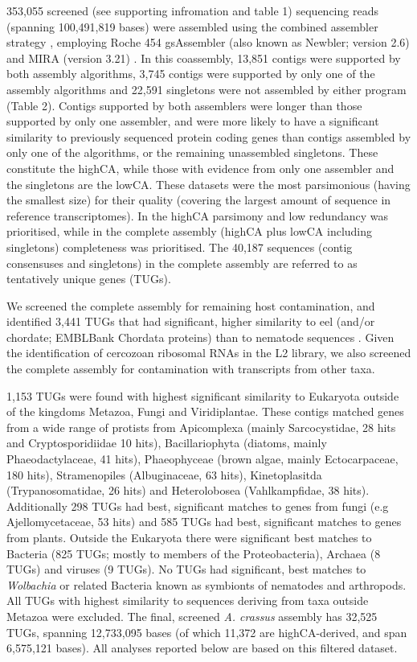 \documentclass[10pt]{bmc_article}
\newenvironment{bmcformat}{\begin{raggedright}\baselineskip20pt\sloppy\setboolean{publ}{false}}{\end{raggedright}\baselineskip20pt\sloppy}
\begin{document}
\begin{bmcformat}
353,055 screened (see supporting infromation and
table 1) sequencing reads (spanning 100,491,819 bases) were
assembled using the combined assembler strategy \cite{pmid20950480},
employing Roche 454 gsAssembler (also known as Newbler; version 2.6)
and MIRA (version 3.21) \cite{miraEST}. In this coassembly,
13,851 contigs were supported by both assembly algorithms,
3,745 contigs were supported by only one of the assembly
algorithms and 22,591 singletons were not assembled by
either program (Table 2). Contigs supported by both assemblers were
longer than those supported by only one assembler, and were more
likely to have a significant similarity to previously sequenced
protein coding genes than contigs assembled by only one of the
algorithms, or the remaining unassembled singletons. These constitute
the highCA, while those with evidence from only one assembler and the
singletons are the lowCA. These datasets were the most parsimonious
(having the smallest size) for their quality (covering the largest
amount of sequence in reference transcriptomes). In the highCA
parsimony and low redundancy was prioritised, while in the complete
assembly (highCA plus lowCA including singletons) completeness was
prioritised. The 40,187 sequences (contig consensuses and singletons)
in the complete assembly are referred to as tentatively unique genes
(TUGs).




We screened the complete assembly for remaining host contamination,
and identified 3,441 TUGs that had significant, higher
similarity to eel (and/or chordate; EMBLBank Chordata proteins) than
to nematode sequences \cite{pmid21550347}. Given the identification of
cercozoan ribosomal RNAs in the L2 library, we also screened the
complete assembly for contamination with transcripts from other taxa.

1,153 TUGs were found with highest significant similarity to Eukaryota
outside of the kingdoms Metazoa, Fungi and Viridiplantae. These
contigs matched genes from a wide range of protists from Apicomplexa
(mainly Sarcocystidae, 28 hits and Cryptosporidiidae 10 hits),
Bacillariophyta (diatoms, mainly Phaeodactylaceae, 41 hits),
Phaeophyceae (brown algae, mainly Ectocarpaceae, 180 hits),
Stramenopiles (Albuginaceae, 63 hits), Kinetoplasitda
(Trypanosomatidae, 26 hits) and Heterolobosea (Vahlkampfidae, 38
hits). Additionally 298 TUGs had best,
significant matches to genes from fungi (e.g Ajellomycetaceae, 53
hits) and 585 TUGs had best, significant matches to genes from
plants. Outside the Eukaryota there were significant best matches to
Bacteria (825 TUGs; mostly to members of the Proteobacteria), Archaea
(8 TUGs) and viruses (9 TUGs). No TUGs had significant, best matches
to \textit{Wolbachia} or related Bacteria known as symbionts of
nematodes and arthropods. All TUGs with highest similarity to
sequences deriving from taxa outside Metazoa were excluded. The final,
screened \textit{A. crassus} assembly has
32,525 TUGs, spanning
12,733,095
bases (of which 11,372 are
highCA-derived, and span
6,575,121
bases). All analyses reported below are based on this filtered
dataset.



\end{bmcformat}
\end{document}
